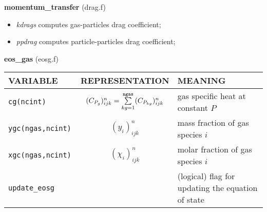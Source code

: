 %
%
{\large{\bf momentum\_transfer}} (drag.f)\\
\begin{itemize}
\item{\em kdrags} computes gas-particles drag coefficient;
\item{\em ppdrag} computes particle-particles drag coefficient;
\end{itemize}
%
%
{\large {\bf eos\_gas}} (eosg.f)\\[5mm]
\begin{tabular}{|p{6cm}|c|p{6cm}|}\hline
VARIABLE & REPRESENTATION & MEANING\\\hline
\tt cg(ncint)          & $(C_{P_g})_{ijk}^n=\sum\limits_{kg=1}^{\tt ngas}(C_{P_{kg}})_{ijk}^n$ &  gas specific heat at constant $P$\\\hline
\tt ygc(ngas,ncint)    & $(y_i)_{ijk}^n$&  mass fraction of gas species $i$\\ \hline
\tt xgc(ngas,ncint)    & $(\chi_i)_{ijk}^n$&  molar fraction of gas species $i$\\ \hline
\tt update\_eosg       & & (logical) flag for updating the equation of state\\ \hline
\end{tabular}\\

